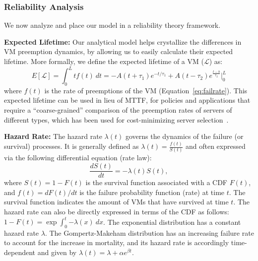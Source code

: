 
\subsubsection{Reliability Analysis}
\label{subsec:reliability}

We now analyze and place our model in a reliability theory framework. 
%

\noindent \textbf{Expected Lifetime:} Our analytical model helps crystallize the differences in VM preemption dynamics, by allowing us to easily calculate their expected lifetime. 
More formally, we define the expected lifetime of a VM ($\mathscr{L}$) as: 
\begin{equation}
  \label{eq:expected-lifetime}
E[\mathscr{L}] =  \int_{0}^{L} t {f}(t)~dt =  -A(t+\tau_1)e^{-t/\tau_1} + A(t-\tau_2) e^{\frac{t-b}{\tau_2}} \biggr\rvert_{0}^{L}
\end{equation}
where $f(t)$ is the rate of preemptions of the VM (Equation~\ref{eq:failrate}).
%
%
This expected lifetime can be used in lieu of MTTF, for policies and applications that require a ``coarse-grained'' comparison of the preemption rates of servers of different types, which has been used for cost-minimizing server selection~\cite{flint}. 


\noindent \textbf{Hazard Rate:}
The hazard rate $\lambda(t)$ governs the dynamics of the failure (or survival) processes. It is generally defined as $\lambda(t) = \frac{f(t)}{S(t)}$ and often expressed via the following differential equation (rate law):
\begin{equation}\label{eq:hazard}
\frac{dS(t)}{dt} = -\lambda(t) S(t),
\end{equation}
where $S(t) = 1 - F(t)$ is the survival function associated with a CDF $F(t)$, and $f(t)=dF(t)/dt$ is the failure probability function (rate) at time $t$. The survival function indicates the amount of VMs that have survived at time $t$.
The hazard rate can also be directly expressed in terms of the CDF as follows: $1-F(t) = \exp{\int_0^t{-\lambda(x) ~dx}}$. 
The exponential distribution has a constant hazard rate $\lambda$.
The Gompertz-Makeham distribution has an increasing failure rate to account for the increase in mortality, and its hazard rate is accordingly time-dependent and given by $\lambda(t) = \lambda + \alpha e^{\beta t}$.

